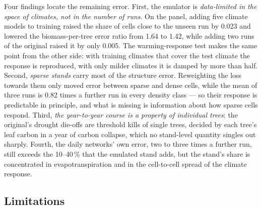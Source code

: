 \documentclass[11pt,a4paper]{article}
\begin{document}
Four findings locate the remaining error. First, the emulator is \emph{data-limited in the space of climates, not in
the number of runs}. On the panel, adding five climate models to training raised the share of cells close to the
unseen run by 0.023 and lowered the biomass-per-tree error ratio from 1.64 to 1.42, while adding two runs of the
original raised it by only 0.005. The warming-response test makes the same point from the other side: with training
climates that cover the test climate the response is reproduced, with only milder climates it is damped by more than
half. Second, \emph{sparse stands} carry most of the structure error. Reweighting the loss towards them only moved error
between sparse and dense cells, while the mean of three runs is 0.82 times a further run in every density class --- so
their response is predictable in principle, and what is missing is information about how sparse cells respond. Third,
\emph{the year-to-year course is a property of individual trees}: the original's drought die-offs are threshold kills
of single trees, decided by each tree's leaf carbon in a year of carbon collapse, which no stand-level quantity
singles out sharply. Fourth, the daily networks' own error, two to three times a further run, still exceeds the
10--40\,\% that the emulated stand adds, but the stand's share is concentrated in evapotranspiration and in the
cell-to-cell spread of the climate response.

\subsection{Limitations}\label{sec:limits}
\end{document}
